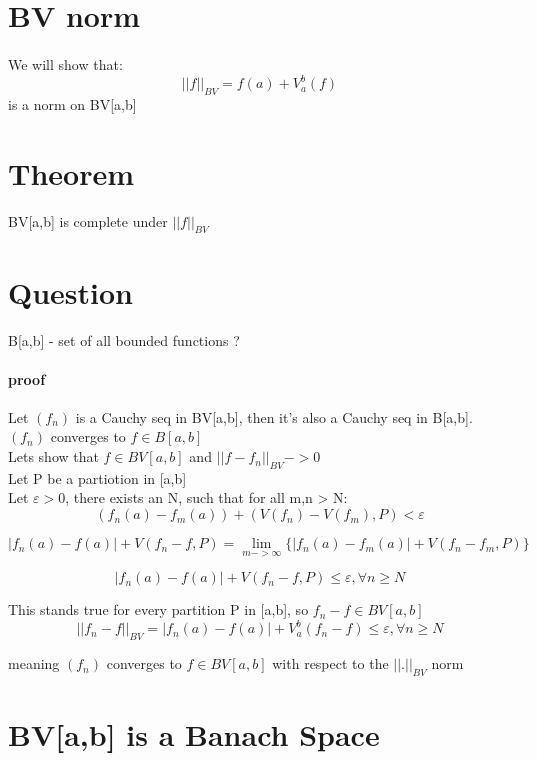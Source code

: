 \documentclass{article}
\begin{document}
\section{BV norm}

\paragraph{}
We will show that:
$$||f||_{BV} = f(a) + V_a^b(f)$$
is a norm on BV[a,b]

\section{Theorem}
BV[a,b] is complete under $||f||_{BV}$

\section{Question}
B[a,b] - set of all bounded functions ?

\paragraph{proof}
Let $(f_n)$ is a Cauchy seq in BV[a,b], then it's also a Cauchy seq in B[a,b]. \\

$(f_n)$ converges to $f \in B[a,b]$ \\

Lets show that $f \in BV[a,b]$ and $||f-f_n||_{BV} ->0$ \\

Let P be a partiotion in [a,b] \\

Let $\varepsilon>0$, there exists an N, such that for all m,n > N: \\
$$(f_{n}(a)-f_{m}(a)) + (V(f_{n})-V(f_{m}), P) < \varepsilon$$

$$|f_{n}(a)-f(a)|+V(f_n-f, P)= \lim_{m->\infty} \{ |f_{n}(a)-f_m(a)|+V(f_n-f_m, P) \}$$

$$|f_{n}(a)-f(a)|+V(f_n-f, P) \leq \varepsilon, \forall n \geq N$$

This stands true for every partition P in [a,b], so $f_{n}-f \in BV[a,b]$ \\

$$||f_n-f||_{BV} = |f_n(a)-f(a)|+V_a^b(f_n-f) \leq \varepsilon, \forall n \geq N$$

meaning $(f_n)$ converges to $f \in BV[a,b]$ with respect to the $||.||_{BV}$ norm

\section{BV[a,b] is a Banach Space}
\end{document}

